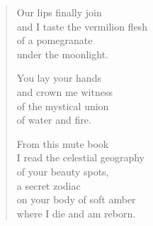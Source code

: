 \documentclass[twocolumn,11pt]{article}
\begin{document}
\begin{verse}
  Our lips finally join \\
  and I taste the vermilion flesh\\
  of a pomegranate \\
  under the moonlight.

  You lay your hands \\
  and crown me witness \\
  of the mystical union \\
  of water and fire.

  From this mute book \\
  I read the celestial geography \\
  of your beauty spots, \\
  a secret zodiac \\
  on your body of soft amber \\
  where I die and am reborn.
\end{verse}
\end{document}
